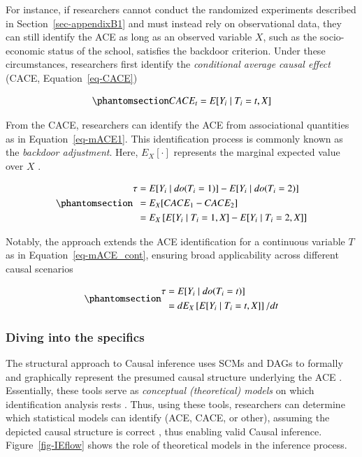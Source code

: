 \documentclass[
  authoryear,
  review,
  1p]{elsarticle}
\begin{document}
For instance, if researchers cannot conduct the randomized experiments
described in Section~\ref{sec-appendixB1} and must instead rely on
observational data, they can still identify the ACE as long as an
observed variable \(X\), such as the socio-economic status of the
school, satisfies the backdoor criterion. Under these circumstances,
researchers first identify the \emph{conditional average causal effect}
(CACE, Equation~\ref{eq-CACE})

\begin{equation}\protect\phantomsection\label{eq-CACE}{
CACE_{t} = E[Y_{i} \mid T_{i}=t, X]
}\end{equation}

From the CACE, researchers can identify the ACE from associational
quantities as in Equation~\ref{eq-mACE1}. This identification process is
commonly known as the \emph{backdoor adjustment}. Here, \(E_{X}[\cdot]\)
represents the marginal expected value over \(X\)
\citep{Morgan_et_al_2014}.

\begin{equation}\protect\phantomsection\label{eq-mACE1}{
\begin{aligned}
  \tau & = E[Y_{i} \mid do(T_{i}=1)]- E[Y_{i} \mid do(T_{i}=2)] \\
  & = E_{X}[CACE_{1} - CACE_{2}] \\
  & = E_{X}\left[ E[Y_{i} \mid T_{i}=1, X] - E[Y_{i} \mid T_{i}=2, X] \right]
\end{aligned}
}\end{equation}

Notably, the approach extends the ACE identification for a continuous
variable \(T\) as in Equation~\ref{eq-mACE_cont}, ensuring broad
applicability across different causal scenarios \citep[p.~45]{Neal_2020}

\begin{equation}\protect\phantomsection\label{eq-mACE_cont}{
\begin{aligned}
  \tau &= E[Y_{i} \mid do(T_{i}=t)] \\
  & = d E_{X}\left[ E[Y_{i} \mid T_{i}=t, X]\right]/ dt
  \end{aligned}
}\end{equation}

\subsubsection{Diving into the specifics}\label{sec-appendixB3}

The structural approach to Causal inference uses SCMs and DAGs to
formally and graphically represent the presumed causal structure
underlying the ACE
\citep{Pearl_2009, Pearl_et_al_2016, Gross_et_al_2018, Neal_2020}.
Essentially, these tools serve as \emph{conceptual (theoretical) models}
on which identification analysis rests
\citep[p.~4]{Schuessler_et_al_2023}. Thus, using these tools,
researchers can determine which statistical models can identify (ACE,
CACE, or other), assuming the depicted causal structure is correct
\citep{McElreath_2020}, thus enabling valid Causal inference.
Figure~\ref{fig-IEflow} shows the role of theoretical models in the
inference process.
\end{document}
